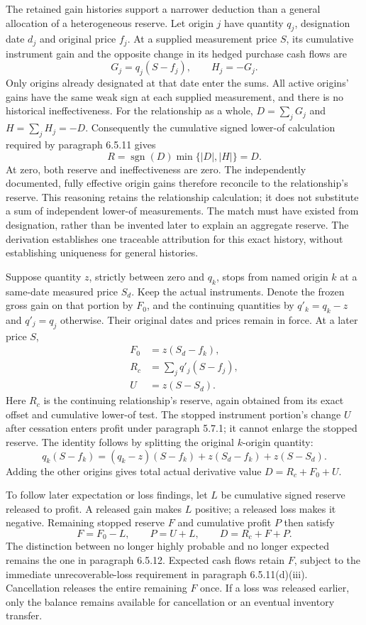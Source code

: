 The retained gain histories support a narrower deduction than a general
allocation of a heterogeneous reserve. Let origin \(j\) have quantity
\(q_j\), designation date \(d_j\) and original price \(f_j\).
At a supplied measurement price \(S\), its cumulative instrument gain and
the opposite change in its hedged purchase cash flows are
\[
 G_j=q_j(S-f_j),\qquad H_j=-G_j.
\]
Only origins already designated at that date enter the sums. All active
origins' gains have the same weak sign at each supplied measurement, and
there is no historical ineffectiveness. For the relationship as a whole,
\(D=\sum_jG_j\) and \(H=\sum_jH_j=-D\). Consequently the cumulative
signed lower-of calculation required by paragraph 6.5.11 gives
\[
 R=\operatorname{sgn}(D)\min\{|D|,|H|\}=D.
\]
At zero, both reserve and ineffectiveness are zero. The independently
documented, fully effective origin gains therefore reconcile to the
relationship's reserve. This reasoning retains the relationship calculation;
it does not substitute a sum of independent lower-of measurements. The match
must have existed from designation, rather than be invented later to explain
an aggregate reserve. The derivation establishes one traceable attribution
for this exact history, without establishing uniqueness for general histories.

Suppose quantity \(z\), strictly between zero and \(q_k\), stops from named
origin \(k\) at a same-date measured price \(S_d\). Keep the actual
instruments. Denote the frozen gross gain on that portion by \(F_0\), and
the continuing quantities by \(q'_k=q_k-z\) and \(q'_j=q_j\) otherwise.
Their original dates and prices remain in force. At a later price \(S\),
\begin{align*}
 F_0&=z(S_d-f_k),\\
 R_c&=\sum_j q'_j(S-f_j),\\
 U&=z(S-S_d).
\end{align*}
Here \(R_c\) is the continuing relationship's reserve, again obtained from
its exact offset and cumulative lower-of test. The stopped instrument
portion's change \(U\) after cessation enters profit under paragraph 5.7.1;
it cannot enlarge the stopped reserve. The identity follows by splitting
the original \(k\)-origin quantity:
\[
 q_k(S-f_k)=(q_k-z)(S-f_k)+z(S_d-f_k)+z(S-S_d).
\]
Adding the other origins gives total actual derivative value
\(D=R_c+F_0+U\).

To follow later expectation or loss findings, let \(L\) be cumulative signed
reserve released to profit. A released gain makes \(L\) positive; a released
loss makes it negative. Remaining stopped reserve \(F\) and cumulative profit
\(P\) then satisfy
\[
 F=F_0-L,\qquad P=U+L,\qquad D=R_c+F+P.
\]
The distinction between no longer highly probable and no longer expected
remains the one in paragraph 6.5.12. Expected cash flows retain \(F\),
subject to the immediate unrecoverable-loss requirement in
paragraph 6.5.11(d)(iii). Cancellation releases the entire remaining \(F\)
once. If a loss was released earlier, only the balance remains available
for cancellation or an eventual inventory transfer.

